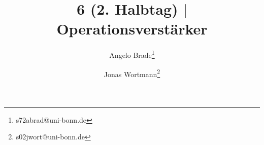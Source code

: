 \documentclass[a4paper,10pt]{article}
\numberwithin{equation}{section}
\begin{document}

\begin{titlepage}
        \title{6 (2. Halbtag) $|$ Operationsverstärker}
        \author[1]{Angelo Brade\thanks{s72abrad@uni-bonn.de}}
        \author[1]{Jonas Wortmann\thanks{s02jwort@uni-bonn.de}}
\end{titlepage}

\maketitle
{}


\clearpage


\fancyhead[R]{\leftmark}
\fancyhead[L]{\thepage}
\fancyfoot[C]{}

\tableofcontents


\clearpage


\end{document}
